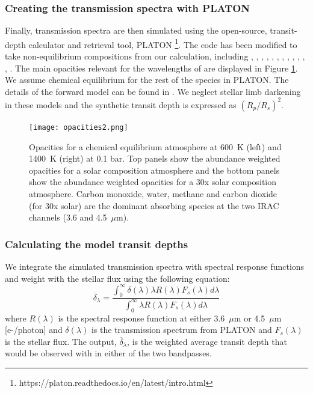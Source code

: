 \subsubsection{Creating the transmission spectra with PLATON}
\label{P1:subsec:PLATON}

Finally, transmission spectra are then simulated using the open-source, transit-depth calculator and retrieval tool, PLATON \citep{Zhang2019}\footnote{https://platon.readthedocs.io/en/latest/intro.html}. The code has been modified to take non-equilibrium compositions from our calculation, including , , , , , , , , , , , , . The main opacities relevant for the wavelengths of \spitzerIRAC are displayed in Figure \ref{P1:fig:opacities}. We assume chemical equilibrium for the rest of the species in PLATON. The details of the forward model can be found in \citet{Zhang2019}. We neglect stellar limb darkening in these models and the synthetic transit depth is expressed as $(R_p/R_s)^2$.

\begin{figure}
    \centering
    \texttt{[image: opacities2.png]}
    \caption{Opacities for a chemical equilibrium atmosphere at 600~K (left) and 1400~K (right) at 0.1 bar. Top panels show the abundance weighted opacities for a solar composition atmosphere and the bottom panels show the abundance weighted opacities for a 30x solar composition atmosphere. Carbon monoxide, water, methane and carbon dioxide (for 30x solar) are the dominant absorbing species at the two IRAC channels (3.6 and 4.5~$\mu$m).}
    \label{P1:fig:opacities}
\end{figure}


\subsubsection{Calculating the model \spitzerIRAC transit depths}

We integrate the simulated transmission spectra with \spitzerIRAC spectral response functions and weight with the stellar flux using the following equation:
\begin{equation}
\overline{\delta}_{\lambda} = \frac{\int_0^\infty  \delta(\lambda) \lambda R(\lambda) F_{s}(\lambda) d\lambda}{\int_0^\infty  \lambda R(\lambda) F_{s}(\lambda) d\lambda}
\end{equation}
where $R(\lambda)$ is the spectral response function at either 3.6~$\mu$m or 4.5~$\mu$m [e-/photon] \citep{Quijada2004} and $\delta(\lambda)$ is the transmission spectrum from PLATON and $F_{s}(\lambda)$ is the stellar flux. The output, $\overline{\delta}_{\lambda}$, is the weighted average transit depth that would be observed with \spitzerIRAC in either of the two bandpasses.

